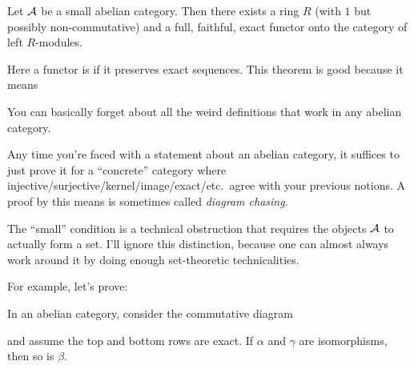 \begin{theorem}
	Let $\AA$ be a small abelian category.
	Then there exists a ring $R$ (with $1$ but possibly non-commutative)
	and a full, faithful, exact functor onto the category of left $R$-modules.
\end{theorem}
Here a functor is  if it preserves exact sequences.
This theorem is good because it means
\begin{moral}
	You can basically forget about all the weird definitions
	that work in any abelian category.
\end{moral}
Any time you're faced with a statement about an abelian category,
it suffices to just prove it for a ``concrete'' category
where injective/surjective/kernel/image/exact/etc.\
agree with your previous notions.
A proof by this means is sometimes called \emph{diagram chasing}.

\begin{remark}
	The ``small'' condition is a technical obstruction
	that requires the objects $\AA$ to actually form a set.
	I'll ignore this distinction,
	because one can almost always work around it
	by doing enough set-theoretic technicalities.
\end{remark}

For example, let's prove:
\begin{lemma}
	In an abelian category, consider the commutative diagram
	\begin{center}
	\end{center}
	and assume the top and bottom rows are exact.
	If $\alpha$ and $\gamma$ are isomorphisms, then so is $\beta$.
\end{lemma}


